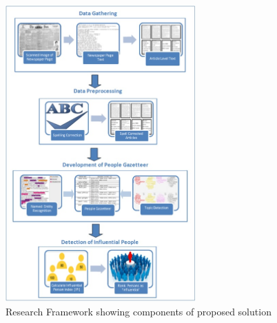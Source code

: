\documentclass[10pt,journal,compsoc]{IEEEtran}
\begin{document}
\begin{figure}
\centering
\includegraphics[width=0.65\textwidth, height=0.6\textheight]{framework4}
\caption{Research Framework showing components of proposed solution}
\label{fig:framework}
\end{figure} 



\end{document}
